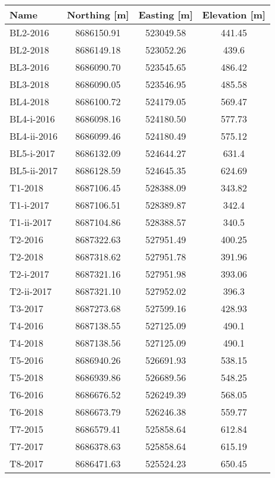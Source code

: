 \begin{tabular}{lccc}
\toprule
        Name & Northing [m] & Easting [m] & Elevation [m] \\
\midrule
    BL2-2016 &   8686150.91 &   523049.58 &        441.45 \\
    BL2-2018 &   8686149.18 &   523052.26 &         439.6 \\
    BL3-2016 &   8686090.70 &   523545.65 &        486.42 \\
    BL3-2018 &   8686090.05 &   523546.95 &        485.58 \\
    BL4-2018 &   8686100.72 &   524179.05 &        569.47 \\
  BL4-i-2016 &   8686098.16 &   524180.50 &        577.73 \\
 BL4-ii-2016 &   8686099.46 &   524180.49 &        575.12 \\
  BL5-i-2017 &   8686132.09 &   524644.27 &         631.4 \\
 BL5-ii-2017 &   8686128.59 &   524645.35 &        624.69 \\
     T1-2018 &   8687106.45 &   528388.09 &        343.82 \\
   T1-i-2017 &   8687106.51 &   528389.87 &         342.4 \\
  T1-ii-2017 &   8687104.86 &   528388.57 &         340.5 \\
     T2-2016 &   8687322.63 &   527951.49 &        400.25 \\
     T2-2018 &   8687318.62 &   527951.78 &        391.96 \\
   T2-i-2017 &   8687321.16 &   527951.98 &        393.06 \\
  T2-ii-2017 &   8687321.10 &   527952.02 &         396.3 \\
     T3-2017 &   8687273.68 &   527599.16 &        428.93 \\
     T4-2016 &   8687138.55 &   527125.09 &         490.1 \\
     T4-2018 &   8687138.56 &   527125.09 &         490.1 \\
     T5-2016 &   8686940.26 &   526691.93 &        538.15 \\
     T5-2018 &   8686939.86 &   526689.56 &        548.25 \\
     T6-2016 &   8686676.52 &   526249.39 &        568.05 \\
     T6-2018 &   8686673.79 &   526246.38 &        559.77 \\
     T7-2015 &   8686579.41 &   525858.64 &        612.84 \\
     T7-2017 &   8686378.63 &   525858.64 &        615.19 \\
     T8-2017 &   8686471.63 &   525524.23 &        650.45 \\
\bottomrule
\end{tabular}

